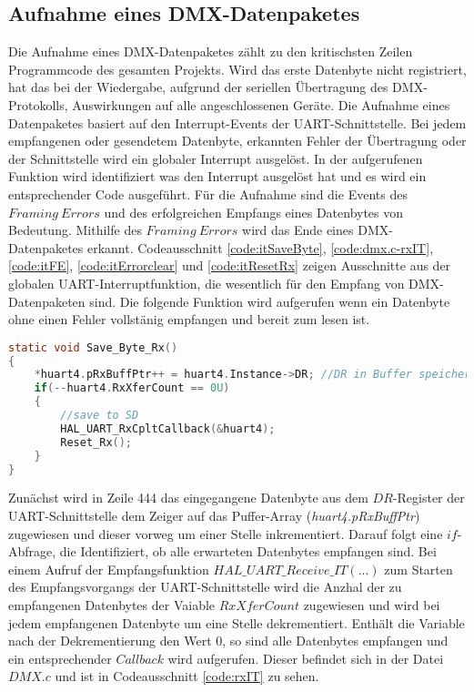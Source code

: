 
\subsection{Aufnahme eines DMX-Datenpaketes}
Die Aufnahme eines DMX-Datenpaketes zählt zu den kritischsten Zeilen Programmcode des gesamten Projekts. Wird das erste Datenbyte nicht registriert, hat das bei der Wiedergabe, aufgrund der seriellen Übertragung des DMX-Protokolls, Auswirkungen auf alle angeschlossenen Geräte. 
Die Aufnahme eines Datenpaketes basiert auf den Interrupt-Events der UART-Schnittstelle. Bei jedem empfangenen oder gesendetem Datenbyte, erkannten Fehler der Übertragung oder der Schnittstelle wird ein globaler Interrupt ausgelöst. In der aufgerufenen Funktion wird identifiziert was den Interrupt ausgelöst hat und es wird ein entsprechender Code ausgeführt. Für die Aufnahme sind die Events des $Framing\ Errors$ und des erfolgreichen Empfangs eines Datenbytes von Bedeutung. Mithilfe des $Framing\ Errors$ wird das Ende eines DMX-Datenpaketes erkannt. Codeausschnitt \ref{code:itSaveByte}, \ref{code:dmx.c-rxIT}, \ref{code:itFE}, \ref{code:itErrorclear} und \ref{code:itResetRx} zeigen Ausschnitte aus der globalen UART-Interruptfunktion, die wesentlich für den Empfang von DMX-Datenpaketen sind. Die folgende Funktion wird aufgerufen wenn ein Datenbyte ohne einen Fehler vollstänig empfangen und bereit zum lesen ist. 
\begin{lstlisting}[caption = stm32f4xx\_it.c: UART Save\_Byte\_Rx(),
label = code:itSaveByte, 
language = C, 
firstnumber = 442]
static void Save_Byte_Rx()
{
	*huart4.pRxBuffPtr++ = huart4.Instance->DR; //DR in Buffer speichern
	if(--huart4.RxXferCount == 0U)
	{
		//save to SD
		HAL_UART_RxCpltCallback(&huart4);
		Reset_Rx();
	}
}
\end{lstlisting}
Zunächst wird in Zeile 444 das eingegangene Datenbyte aus dem $DR$-Register der UART-Schnittstelle dem Zeiger auf das Puffer-Array (\textit{huart4.pRxBuffPtr}) zugewiesen und dieser vorweg um einer Stelle inkrementiert. %
Darauf folgt eine $if$-Abfrage, die Identifiziert, ob alle erwarteten Datenbytes empfangen sind. Bei einem Aufruf der Empfangsfunktion $HAL\_UART\_Receive\_IT(...)$ zum Starten des Empfangsvorgangs der UART-Schnittstelle wird die Anzhal der zu empfangenen Datenbytes der Vaiable $RxXferCount$ zugewiesen und wird bei jedem empfangenen Datenbyte um eine Stelle dekrementiert. Enthält die Variable nach der Dekrementierung den Wert 0, so sind alle Datenbytes empfangen und ein entsprechender $Callback$ wird aufgerufen. Dieser befindet sich in der Datei $DMX.c$ und ist in Codeausschnitt \ref{code:rxIT} zu sehen. 
